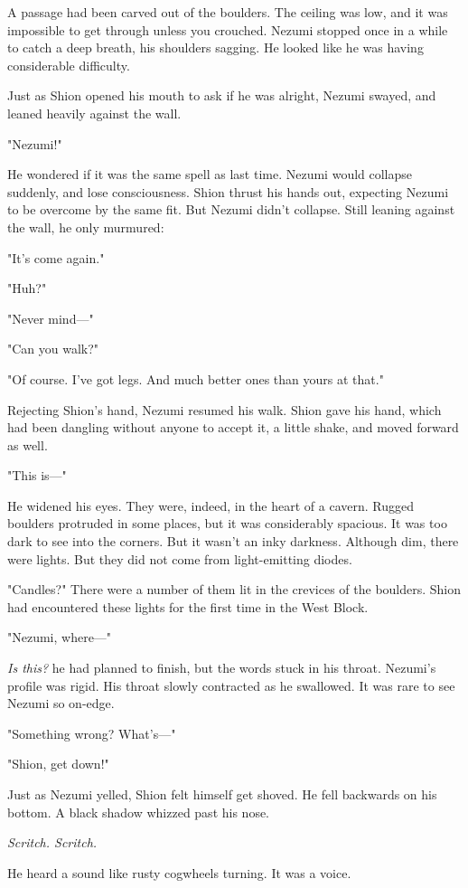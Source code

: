 A passage had been carved out of the boulders. The ceiling was low, and
it was impossible to get through unless you crouched. Nezumi stopped
once in a while to catch a deep breath, his shoulders sagging. He looked
like he was having considerable difficulty.

Just as Shion opened his mouth to ask if he was alright, Nezumi swayed,
and leaned heavily against the wall.

"Nezumi!"

He wondered if it was the same spell as last time. Nezumi would collapse
suddenly, and lose consciousness. Shion thrust his hands out, expecting
Nezumi to be overcome by the same fit. But Nezumi didn't collapse. Still
leaning against the wall, he only murmured:

"It's come again."

"Huh?"

"Never mind---"

"Can you walk?"

"Of course. I've got legs. And much better ones than yours at that."

Rejecting Shion's hand, Nezumi resumed his walk. Shion gave his hand,
which had been dangling without anyone to accept it, a little shake, and
moved forward as well.

"This is---"

He widened his eyes. They were, indeed, in the heart of a cavern. Rugged
boulders protruded in some places, but it was considerably spacious. It
was too dark to see into the corners. But it wasn't an inky darkness.
Although dim, there were lights. But they did not come from
light-emitting diodes.

"Candles?" There were a number of them lit in the crevices of the
boulders. Shion had encountered these lights for the first time in the
West Block.

"Nezumi, where---"

\emph{Is this?} he had planned to finish, but the words stuck in his throat.
Nezumi's profile was rigid. His throat slowly contracted as he
swallowed. It was rare to see Nezumi so on-edge.

"Something wrong? What's---"

"Shion, get down!"

Just as Nezumi yelled, Shion felt himself get shoved. He fell backwards
on his bottom. A black shadow whizzed past his nose.

\emph{Scritch. Scritch.}

He heard a sound like rusty cogwheels turning. It was a voice.


